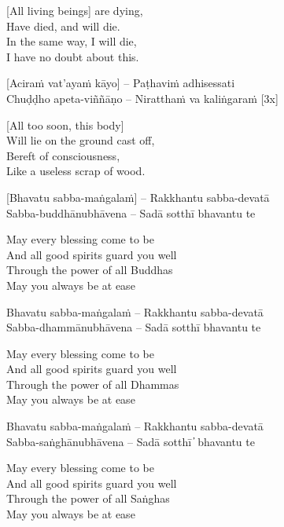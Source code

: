 \begin{english}
  [All living beings] are dying,\\
  Have died, and will die.\\
  In the same way, I will die,\\
  I have no doubt about this.
\end{english}

\suttaRef{[Thai]}

[Aciraṁ vat’ayaṁ kāyo] – Paṭhaviṁ adhisessati\\
Chuḍḍho apeta-viññāṇo – Niratthaṁ va kaliṅgaraṁ [3x]

\begin{english}
  [All too soon, this body]\\
  Will lie on the ground cast off,\\
  Bereft of consciousness,\\
  Like a useless scrap of wood.
\end{english}

\suttaRef{[Dhp 41]}

[Bhavatu sabba-maṅgalaṁ] – Rakkhantu sabba-devatā\\
Sabba-buddhānubhāvena – Sadā sotthī bhavantu te

\begin{english}
  May every blessing come to be\\
  And all good spirits guard you well\\
  Through the power of all Buddhas\\
  May you always be at ease
\end{english}

Bhavatu sabba-maṅgalaṁ – Rakkhantu sabba-devatā\\
Sabba-dhammānubhāvena – Sadā sotthī bhavantu te

\begin{english}
  May every blessing come to be\\
  And all good spirits guard you well\\
  Through the power of all Dhammas\\
  May you always be at ease
\end{english}

Bhavatu sabba-maṅgalaṁ – Rakkhantu sabba-devatā\\
Sabba-saṅghānubhāvena – Sadā sotthī  ̓  bhavantu te

\begin{english}
  May every blessing come to be\\
  And all good spirits guard you well\\
  Through the power of all Saṅghas\\
  May you always be at ease
\end{english}
